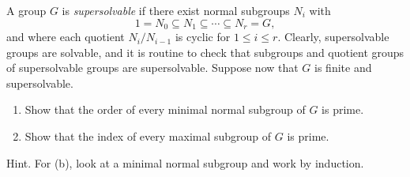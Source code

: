 \begin{probl}\label{problem-3.B.7}
    A group\/ $G$ is \textsl{supersolvable} if there exist normal subgroups\/ $N_i$ with
    $$
        1 = N_0 \subseteq N_1 \subseteq \cdots \subseteq N_r = G,
    $$
    and where each quotient\/ $N_i / N_{i-1}$ is cyclic for\/ $1\le i\le r$. Clearly, supersolvable groups are solvable, and it is routine to check that subgroups and quotient groups of supersolvable groups are supersolvable. Suppose now that\/ $G$ is finite and supersolvable.
    \begin{enumerate}[\rm a)]
        \item Show that the order of every minimal normal subgroup of\/ $G$ is prime.
        \item Show that the index of every maximal subgroup of\/ $G$ is prime.
    \end{enumerate}
    \textrm{\rm Hint. For (b), look at a minimal normal subgroup and work by induction.}
\end{probl}

